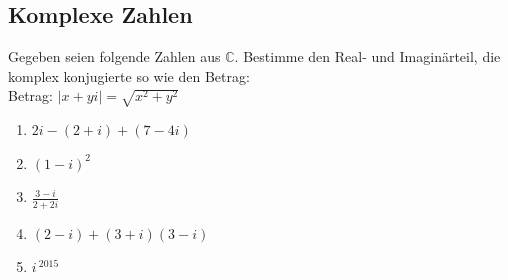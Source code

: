 \documentclass[11pt, a4paper]{article}
\newcommand\braces[1]{\left(#1\right)}
\newcommand{\abs}[1]{\left\lvert#1\right\rvert}
\newif\ifshowsolution
\begin{document}
\subsection{Komplexe Zahlen}
Gegeben seien folgende Zahlen aus $\mathbb{C}$. Bestimme den Real- und Imaginärteil, die komplex konjugierte so wie den Betrag: \\
Betrag: $\abs{x+yi} = \sqrt{x^2+y^2}$
\begin{enumerate}
	\item $2i - (2 + i) + (7 - 4i)$
	
	\ifshowsolution
		$2i - (2 + i) + (7 - 4i) = i-2 + (7-4i) = 5-3i$ \\
		Realteil: $5$ \\
		Imaginärteil: $-3$ \\
		Komplex Konjugierte: $5+3i$ \\
		Betrag: $\sqrt{5^2 + (-3)^2} = \sqrt{25+9} = \sqrt{34}$
	\fi
	
	\item $(1-i)^2$
	
	\ifshowsolution
		$(1-i)^2 = 1-2i+i^2 = 1-2i-1 = -2i$ \\
		Realteil: $0$ \\
		Imaginärteil: $-2$ \\
		Komplex Konjugierte: $2i$ \\
		Betrag: $\sqrt{(-2)^2} = \sqrt{4} = 2$
	\fi
	
	\item $\frac{3-i}{2+2i}$
	
	\ifshowsolution
		$\frac{3-i}{2+2i} = \frac{(3-i) \ \overline{(2+2i)}}{(2+2i) \ \overline{(2+2i)}} = \frac{(3-i)(2-2i)}{(2+2i)(2-2i)} = \frac{6-8i+2i^2}{4-4i^2} = \frac{6-8i-2}{4+4} = \frac{4-8i}{8} = \frac{1}{2}-i$ \\
		Realteil: $\frac{1}{2}$ \\
		Imaginärteil: $-1$ \\
		Komplex Konjugierte: $\frac{1}{2}+i$ \\
		Betrag: $\sqrt{\braces{\frac{1}{2}}^2+(-1)^2} = \sqrt{\frac{1}{4}+1} = \frac{\sqrt{5}}{2}$
	\fi
	
	\item $(2-i) + (3+i)(3-i)$
	
	\ifshowsolution
		$(2-i) + (3+i)(3-i) = (2-i) + (9-3i+3i-i^2) = 12-i$ \\
		Realteil: $12$ \\
		Imaginärteil: $-1$ \\
		Komplex Konjugierte: $12+i$ \\
		Betrag: $\sqrt{12^2 + (-1)^2} = \sqrt{145}$
	\fi
	
	\item $i^{\ 2015}$
	
	\ifshowsolution
		$i^{\ 2015} = i^{\ 503 \cdot 4 + 3} = i^{503 \cdot 4} \cdot i^3 = i^4 \cdot i^3 = 1 \cdot (-i) = 0-i$ \\
		Realteil: $0$ \\
		Imaginärteil: $-1$ \\
		Komplex Konjugierte: $0+i$ \\
		Betrag: $\sqrt{(-1)^2} = 1$
	\fi
\end{enumerate}
\end{document}
